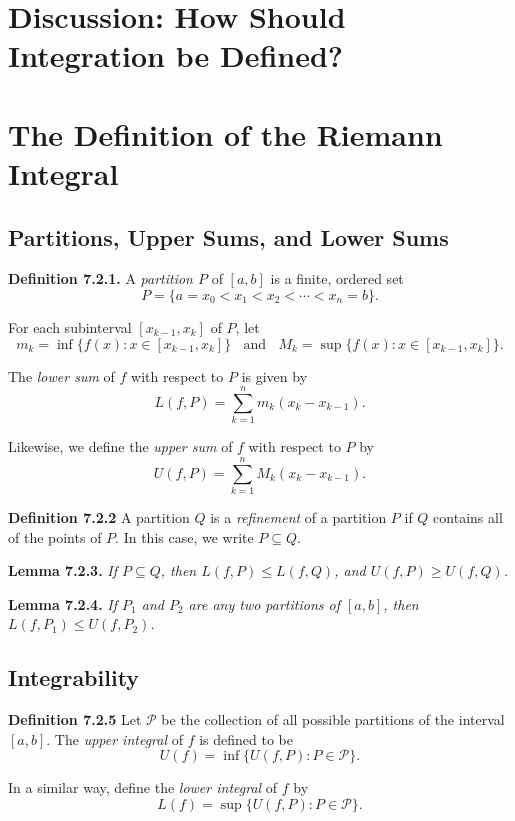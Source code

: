 \documentclass[12pt]{report}
\begin{document}
\section{Discussion: How Should Integration be Defined?}

\section{The Definition of the Riemann Integral}

\subsection*{Partitions, Upper Sums, and Lower Sums}

\noindent \textbf{Definition 7.2.1.} A \textit{partition $P$} of $[a,b]$ is a finite, ordered set
\[P=\{a=x_0<x_1<x_2<\cdots<x_n=b\}.\]

\noindent For each subinterval $[x_{k-1},x_k]$ of $P$, let
\[m_k=\inf\{f(x):x\in[x_{k-1},x_k]\}\ \ \ \ \mathrm{and}\ \ \ \ M_k=\sup\{f(x):x\in[x_{k-1},x_k]\}.\]

\noindent The \textit{lower sum} of $f$ with respect to $P$ is given by
\[L(f,P)=\sum_{k=1}^nm_k(x_k-x_{k-1}).\]

\noindent Likewise, we define the \textit{upper sum} of $f$ with respect to $P$ by
\[U(f,P)=\sum_{k=1}^nM_k(x_k-x_{k-1}).\]
\bigskip

\noindent \textbf{Definition 7.2.2} A partition $Q$ is a \textit{refinement} of a partition $P$ if $Q$ contains all of the points of $P$.  In this case, we write $P\subseteq Q$.
\bigskip

\noindent \textbf{Lemma 7.2.3.} \textit{If $P\subseteq Q$, then $L(f,P)\leq L(f,Q)$, and $U(f,P)\geq U(f,Q)$.}
\bigskip

\noindent \textbf{Lemma 7.2.4.} \textit{If $P_1$ and $P_2$ are any two partitions of $[a,b]$, then $L(f,P_1)\leq U(f,P_2)$.}
\bigskip

\subsection*{Integrability}

\noindent \textbf{Definition 7.2.5} Let $\mathcal{P}$ be the collection of all possible partitions of the interval $[a,b]$.  The \textit{upper integral} of $f$ is defined to be
\[U(f)=\inf\{U(f,P):P\in\mathcal{P}\}.\]

\noindent In a similar way, define the \textit{lower integral} of $f$ by
\[L(f)=\sup\{U(f,P):P\in\mathcal{P}\}.\]
\bigskip
\end{document}
